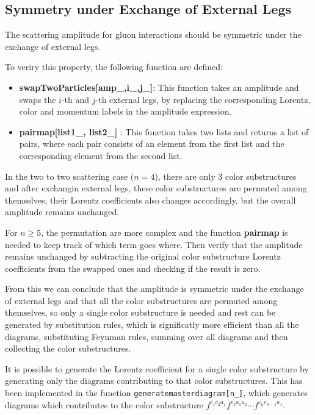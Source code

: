 \documentclass[main.tex]{subfiles}
\begin{document}
\subsection{Symmetry under Exchange of External Legs}
The scattering amplitude for gluon interactions should be symmetric under the exchange of external legs.

To veriry this property, the following function are defined:

\begin{itemize}
    \item \textbf{swapTwoParticles[amp_,i_,j_]}: This function takes an amplitude and swaps the $i$-th and $j$-th external legs, 
    by replacing the corresponding Lorentz, color and momentum labels in the amplitude expression.
    \item \textbf{pairmap[list1_, list2_]} : This function takes two lists and returns a list of pairs, where each pair consists of an element from the first list and the corresponding element from the second list.
\end{itemize}

In the two to two scattering case ($n=4$), there are only 3 color substructures and after exchangin external legs, these color substructures
are permuted among themselves, their Lorentz coefficients also changes accordingly, but the overall amplitude remains unchanged.

For $n \ge 5$, the permutation are more complex and the function \textbf{pairmap} is needed to keep track of which term goes where. Then verify that the amplitude remains unchanged 
by subtracting the original color substructure Lorentz coefficients from the swapped ones and checking if the result is zero.

From this we can conclude that the amplitude is symmetric under the exchange of external legs and that
all the color substructures are permuted among themselves, so only a single color substructure is needed and rest can be generated
by substitution rules, which is significatly more efficient than all the diagrams, substituting Feynman rules, summing over all diagrams 
and then collecting the color substructures. 

It is possible to generate the Lorentz coefficient for a single color substructure by generating only the diagrams
contributing to that color substructures. This has been implemented in the function \texttt{generatemasterdiagram[n_]}, which
generates diagrams which contributes to the color substructure $f^{c_1 c_2 a_1}f^{c_3 a_1 a_2}\cdots f^{c_n c_{n-1} a_1}$.
\end{document}
